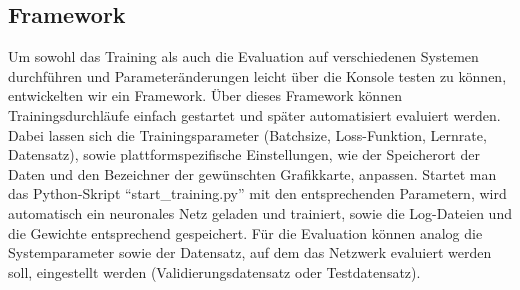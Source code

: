 \subsection{Framework}

Um sowohl das Training als auch die Evaluation auf verschiedenen Systemen durchführen und Parameteränderungen leicht über die Konsole testen zu können, entwickelten wir ein Framework. Über dieses Framework können Trainingsdurchläufe einfach gestartet und später automatisiert evaluiert werden. Dabei lassen sich die Trainingsparameter (Batchsize, Loss-Funktion, Lernrate, Datensatz), sowie plattformspezifische Einstellungen, wie der Speicherort der Daten und den Bezeichner der gewünschten Grafikkarte, anpassen. Startet man das Python-Skript ``start\_training.py'' mit den entsprechenden Parametern, wird automatisch ein neuronales Netz geladen und trainiert, sowie die Log-Dateien und die Gewichte entsprechend gespeichert. Für die Evaluation können analog die Systemparameter sowie der Datensatz, auf dem das Netzwerk evaluiert werden soll, eingestellt werden (Validierungsdatensatz oder Testdatensatz).


